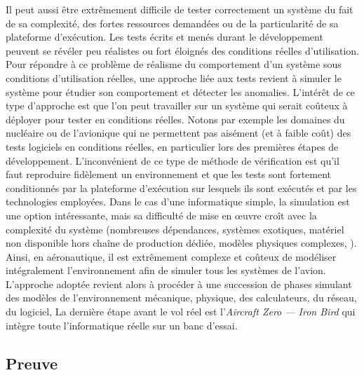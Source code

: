 Il peut aussi être extrêmement difficile de tester correctement un système du
fait de sa complexité, des fortes ressources demandées ou de la particularité
de sa plateforme d'exécution. Les tests écrits et menés durant le développement
peuvent se révéler peu réalistes ou fort éloignés des conditions réelles
d'utilisation. Pour répondre à ce problème de réalisme du comportement d'un
système sous conditions d'utilisation réelles, une approche liée aux tests
revient à simuler le système pour étudier son comportement et
détecter les anomalies. L'intérêt de ce type d'approche est que l'on peut
travailler sur un système qui serait coûteux à déployer pour tester en
conditions réelles. Notons par exemple les domaines du nucléaire ou de
l'avionique qui ne permettent pas aisément (et à faible coût) des tests
logiciels en conditions réelles, en particulier lors des premières étapes de
développement. L'inconvénient de ce type de méthode de vérification est qu'il
faut reproduire fidèlement un environnement et que les tests sont fortement
conditionnés par la plateforme d'exécution sur lesquels ils sont exécutés et
par les technologies employées. Dans le cas d'une informatique simple, la
simulation est une option intéressante, mais sa difficulté de mise en œuvre
croît avec la complexité du système (nombreuses dépendances, systèmes
exotiques, matériel non disponible hors chaîne de production dédiée, modèles
physiques complexes, {\etc}). Ainsi, en aéronautique, il est extrêmement
complexe et coûteux de modéliser intégralement l'environnement afin de simuler
tous les systèmes de l'avion. L'approche adoptée revient alors à procéder à une
succession de phases simulant des modèles de l'environnement mécanique,
physique, des calculateurs, du réseau, du logiciel, {\etc} La dernière étape
avant le vol réel est l'\emph{Aircraft Zero --- Iron Bird} qui intègre toute
l'informatique réelle sur un banc d'essai.



\subsection{Preuve}
\label{ch:verification:subsec:preuve}

